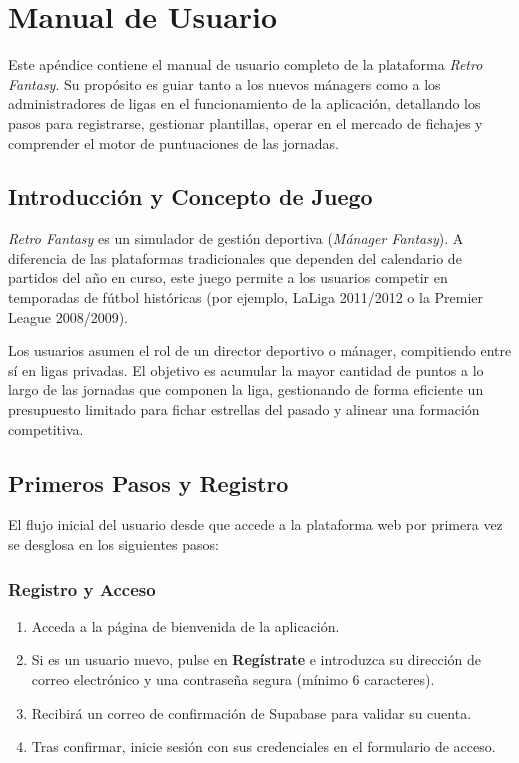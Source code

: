 \chapter{Manual de Usuario}
\label{app:manual_usuario}

Este apéndice contiene el manual de usuario completo de la plataforma \textit{Retro Fantasy}. Su propósito es guiar tanto a los nuevos mánagers como a los administradores de ligas en el funcionamiento de la aplicación, detallando los pasos para registrarse, gestionar plantillas, operar en el mercado de fichajes y comprender el motor de puntuaciones de las jornadas.


\section{Introducción y Concepto de Juego}
\textit{Retro Fantasy} es un simulador de gestión deportiva (\textit{Mánager Fantasy}). A diferencia de las plataformas tradicionales que dependen del calendario de partidos del año en curso, este juego permite a los usuarios competir en temporadas de fútbol históricas (por ejemplo, LaLiga 2011/2012 o la Premier League 2008/2009). 

Los usuarios asumen el rol de un director deportivo o mánager, compitiendo entre sí en ligas privadas. El objetivo es acumular la mayor cantidad de puntos a lo largo de las jornadas que componen la liga, gestionando de forma eficiente un presupuesto limitado para fichar estrellas del pasado y alinear una formación competitiva.


\section{Primeros Pasos y Registro}

El flujo inicial del usuario desde que accede a la plataforma web por primera vez se desglosa en los siguientes pasos:

\subsection{Registro y Acceso}
\begin{enumerate}
    \item Acceda a la página de bienvenida de la aplicación.
    \item Si es un usuario nuevo, pulse en \textbf{Regístrate} e introduzca su dirección de correo electrónico y una contraseña segura (mínimo 6 caracteres).
    \item Recibirá un correo de confirmación de Supabase para validar su cuenta.
    \item Tras confirmar, inicie sesión con sus credenciales en el formulario de acceso.
\end{enumerate}

